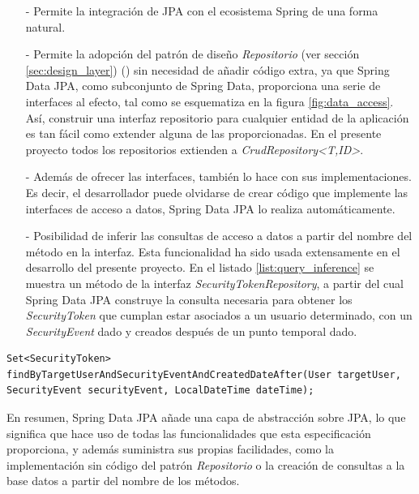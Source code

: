 \documentclass[a4paper,12pt,twoside,openright]{report}
\begin{document}
    \begin{itemize}
    	\item[-] Permite la integración de JPA con el ecosistema Spring de una forma natural.
    	\item[-] Permite la adopción del patrón de diseño \emph{Repositorio} (ver sección \ref{sec:design_layer}) (\cite{JanssenRepository}) sin necesidad de añadir código extra, ya que Spring Data JPA, como subconjunto de Spring Data, proporciona una serie de interfaces al efecto, tal como se esquematiza en la figura \ref{fig:data_access}. Así, construir una interfaz repositorio para cualquier entidad de la aplicación es tan fácil como extender alguna de las proporcionadas. En el presente proyecto todos los repositorios extienden a \emph{CrudRepository\textless{}T,ID\textgreater{}}.
    	\item[-] Además de ofrecer las interfaces, también lo hace con sus implementaciones. Es decir, el desarrollador puede olvidarse de crear código que implemente las interfaces de acceso a datos, Spring Data JPA lo realiza automáticamente.
    	\item[-] Posibilidad de inferir las consultas de acceso a datos a partir del nombre del método en la interfaz. Esta funcionalidad ha sido usada extensamente en el desarrollo del presente proyecto. En el listado \ref{list:query_inference} se muestra un método de la interfaz \emph{SecurityTokenRepository}, a partir del cual Spring Data JPA construye la consulta necesaria para obtener los \emph{SecurityToken} que cumplan estar asociados a un usuario determinado, con un \emph{SecurityEvent} dado y creados después de un punto temporal dado.
    \end{itemize}
    
    \begin{lstlisting}[caption=Ejemplo de método a partir del cual Spring Data JPA infiere la consulta apropiada,label=list:query_inference]
    Set<SecurityToken> findByTargetUserAndSecurityEventAndCreatedDateAfter(User targetUser, SecurityEvent securityEvent, LocalDateTime dateTime);
    \end{lstlisting}
    
    En resumen, Spring Data JPA añade una capa de abstracción sobre JPA, lo que significa que hace uso de todas las funcionalidades que esta especificación proporciona, y además suministra sus propias facilidades, como la implementación sin código del patrón \emph{Repositorio} o la creación de consultas a la base datos a partir del nombre de los métodos.
    
\end{document}
